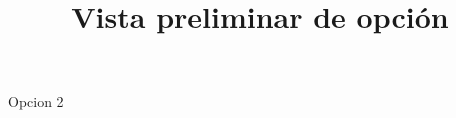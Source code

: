 \documentclass[a4paper,10pt]{article}\usepackage[utf8]{inputenc}\usepackage[spanish]{babel}\usepackage{arial}
\title{Vista preliminar de opción}
\begin{document}
\twocolumn 

\maketitle

Opcion 2
\end{document}
